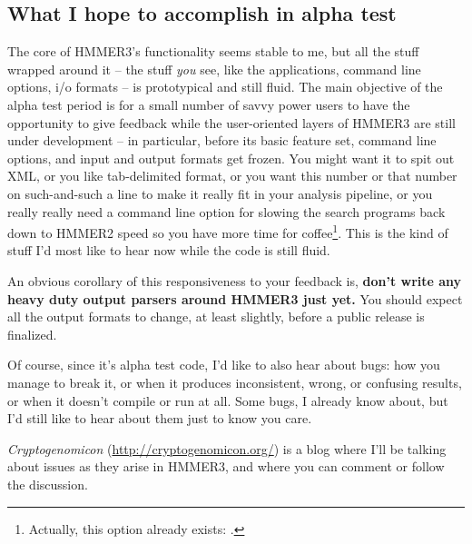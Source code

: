 \subsection{What I hope to accomplish in alpha test}

The core of HMMER3's functionality seems stable to me, but all the
stuff wrapped around it -- the stuff \emph{you} see, like the
applications, command line options, i/o formats -- is prototypical and
still fluid.  The main objective of the alpha test period is for a
small number of savvy power users to have the opportunity to give
feedback while the user-oriented layers of HMMER3 are still under
development -- in particular, before its basic feature set, command
line options, and input and output formats get frozen. You might want
it to spit out XML, or you like tab-delimited format, or you want this
number or that number on such-and-such a line to make it really fit in
your analysis pipeline, or you really really need a command line
option for slowing the search programs back down to HMMER2 speed so
you have more time for coffee\footnote{Actually, this option already
exists: .}. This is the kind of stuff I'd most like to
hear now while the code is still fluid.

\begin{sidebar}
An obvious corollary of this responsiveness to your feedback is,
\textbf{don't write any heavy duty output parsers around HMMER3 just
yet.} You should expect all the output formats to change, at least
slightly, before a public release is finalized.
\end{sidebar}

Of course, since it's alpha test code, I'd like to also hear about
bugs: how you manage to break it, or when it produces inconsistent,
wrong, or confusing results, or when it doesn't compile or run at all.
Some bugs, I already know about, but I'd still like to hear about them
just to know you care.

\emph{Cryptogenomicon} (\url{http://cryptogenomicon.org/}) is a blog
where I'll be talking about issues as they arise in HMMER3, and where
you can comment or follow the discussion.





















  









